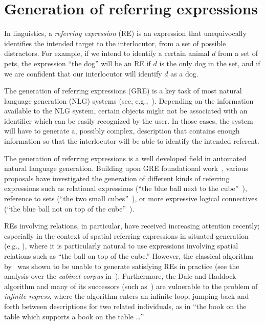 \section{Generation of referring expressions}\label{sec:gre}

In linguistics, a \emph{referring expression} (RE) is an expression that 
unequivocally identifies the intended target to the interlocutor, from a set of possible distractors.  
For example, if we intend to identify a certain animal $d$ from a set of pets, the expression 
``the dog'' will be an RE if $d$ is the only dog in the set, and if we are confident
that our interlocutor will identify $d$ as a dog. 

The generation of referring expressions (GRE)  is a key task of most natural 
language generation (NLG) systems (see, e.g.,~\cite[Section 5.4]{dale2000}). 
Depending on the information available to the NLG system, certain objects might 
not be associated with an identifier which can be easily recognized by the user. 
In those cases, the system will have to generate a, possibly complex, description that contains 
enough information so that the interlocutor will be able to identify the intended referent.

The generation of referring expressions is a well developed field in automated natural language generation.
Building upon GRE foundational work~\cite{winograd,dale89cooking,Dale1995},
various proposals have investigated the generation of different kinds of referring expressions 
such as relational expressions (``the blue ball next to the cube''~\cite{dale91:_gener_refer_expres_invol_relat}),
reference to sets (``the two small cubes''~\cite{Stone2000}), or more expressive logical connectives (``the 
blue ball not on top of the cube''~\cite{deemter02:_gener_refer_expres}).

REs involving relations, in particular, have
received increasing attention recently; especially in the context of
spatial referring expressions in situated generation (e.g., \cite{kelleher06:_increm_gener_of_spatial_refer}), where it is
particularly natural to use expressions involving spatial relations such as ``the ball on top of the cube.''  However, the classical algorithm by~ was shown to be unable to generate satisfying REs in practice (see the 
analysis over the \emph{cabinet corpus} in~\cite{viethen06:_algor_for_gener_refer_expres}).  Furthermore, the Dale
and Haddock algorithm and many of its successors (such as~\cite{kelleher06:_increm_gener_of_spatial_refer}) are vulnerable to
the problem of \emph{infinite regress}, where the algorithm enters an infinite loop, jumping back
and forth between descriptions for two related individuals, as in ``the book on the table which supports a book on the
table \ldots''

